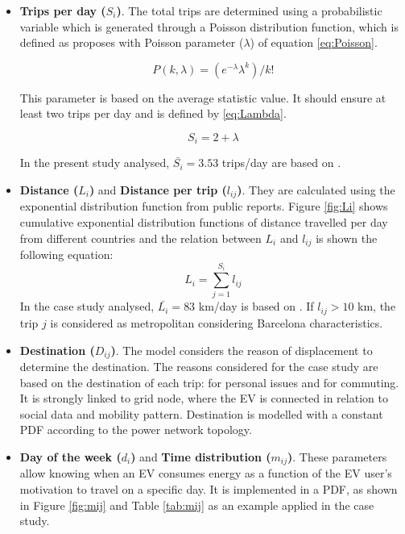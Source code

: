 \documentclass[a4paper,11pt,twoside,openright]{report}
\begin{document}
\begin{itemize}
	\item \textbf{Trips per day ($S_{i}$)}. The total trips are determined using a probabilistic variable which is generated through a Poisson distribution function, which is defined as \cite{xu2010GPS_Poisson} proposes with Poisson parameter ($\lambda$) of equation \ref{eq:Poisson}.
	
	\begin{equation} \label{eq:Poisson}
	P(k,\lambda)=(e^{-\lambda}\lambda^{k})/k!
	\end{equation}
	
	This parameter is based on the average statistic value. It should ensure at least two trips per day and is defined by \ref{eq:Lambda}.
	
	\begin{equation} \label{eq:Lambda}
	S_{i}=2+\lambda
	\end{equation}
	
	In the present study analysed, $\bar{S_{i}}=3.53$ trips/day are based on \cite{EMQ2006}.
	
	\item \textbf{Distance ($L_{i}$)} and \textbf{Distance per trip ($l_{ij}$)}. They are calculated using the exponential distribution function from public reports. Figure \ref{fig:Li} shows cumulative exponential distribution functions of distance travelled per day from different countries and the relation between $L_{i}$ and $l_{ij}$ is shown the following equation:
	\begin{equation} \label{eq:Li}
	L_{i}=\sum_{j=1}^{S_{i}} l_{ij}
	\end{equation}
	In the case study analysed, $\bar{L_{i}}=83$ km/day is based on \cite{Cetelem_Distancia}.
	If $l_{ij}>10$ km, the trip $j$ is considered as metropolitan considering Barcelona characteristics.
	
	\item \textbf{Destination ($D_{ij}$)}. 
	The model considers the reason of displacement to determine the destination.
	The reasons considered for the case study are based on the destination of each trip: for personal issues and for commuting.  It is strongly linked to grid node, where the EV is connected in relation to social data and mobility pattern. Destination is modelled with a constant PDF according to the power network topology.
	
	\item \textbf{Day of the week ($d_{i}$)} and \textbf{Time distribution ($m_{ij}$)}. These parameters allow knowing when an EV consumes energy as a function of the EV user's motivation to travel on a specific day. It is implemented in a PDF, as shown in Figure \ref{fig:mij} and Table \ref{tab:mij} as an example applied in the case study.
	

\end{itemize}
\end{document}

